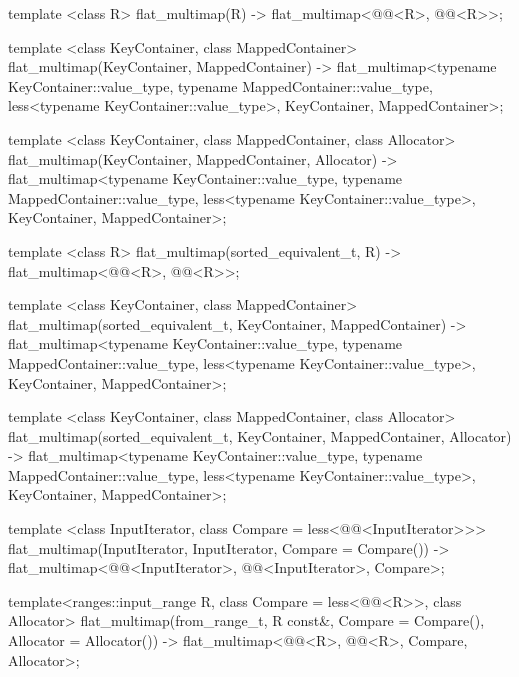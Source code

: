 \begin{addedblock}
\begin{codeblock}
{  template <class R>
    flat_multimap(R)
      -> flat_multimap<@@<R>, @@<R>>;

  template <class KeyContainer, class MappedContainer>
    flat_multimap(KeyContainer, MappedContainer)
      -> flat_multimap<typename KeyContainer::value_type,
                       typename MappedContainer::value_type,
                       less<typename KeyContainer::value_type>,
                       KeyContainer, MappedContainer>;

  template <class KeyContainer, class MappedContainer, class Allocator>
    flat_multimap(KeyContainer, MappedContainer, Allocator)
      -> flat_multimap<typename KeyContainer::value_type,
                       typename MappedContainer::value_type,
                       less<typename KeyContainer::value_type>,
                       KeyContainer, MappedContainer>;

  template <class R>
    flat_multimap(sorted_equivalent_t, R)
      -> flat_multimap<@@<R>, @@<R>>;

  template <class KeyContainer, class MappedContainer>
    flat_multimap(sorted_equivalent_t, KeyContainer, MappedContainer)
      -> flat_multimap<typename KeyContainer::value_type,
                       typename MappedContainer::value_type,
                       less<typename KeyContainer::value_type>,
                       KeyContainer, MappedContainer>;

  template <class KeyContainer, class MappedContainer, class Allocator>
    flat_multimap(sorted_equivalent_t, KeyContainer, MappedContainer, Allocator)
      -> flat_multimap<typename KeyContainer::value_type,
                       typename MappedContainer::value_type,
                       less<typename KeyContainer::value_type>,
                       KeyContainer, MappedContainer>;

  template <class InputIterator, class Compare = less<@@<InputIterator>>>
    flat_multimap(InputIterator, InputIterator, Compare = Compare())
      -> flat_multimap<@@<InputIterator>, @@<InputIterator>, Compare>;

  template<ranges::input_range R, class Compare = less<@@<R>>,
           class Allocator>
    flat_multimap(from_range_t, R const&, Compare = Compare(), Allocator = Allocator())
      -> flat_multimap<@@<R>, @@<R>, Compare, Allocator>;

}
\end{codeblock}
\end{addedblock}
